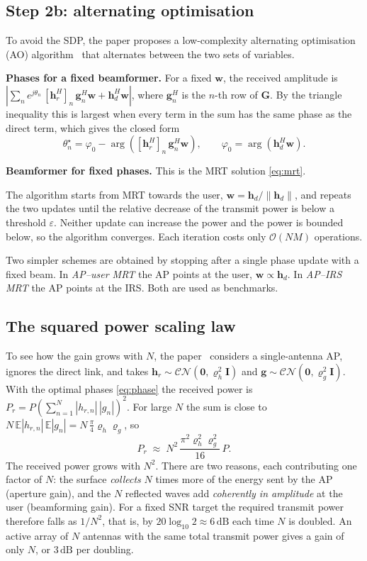 \documentclass[11pt,a4paper]{article}
\newcommand{\hrv}{\bm{h}_r}
\newcommand{\hdv}{\bm{h}_d}
\newcommand{\Gm}{\bm{G}}
\newcommand{\wv}{\bm{w}}
\newcommand{\udB}{\,\text{dB}}
\begin{document}
\subsection{Step 2b: alternating optimisation}

To avoid the SDP, the paper proposes a low-complexity alternating optimisation (AO) algorithm~\cite[Sec.~III-B]{wu} that alternates between the two sets of
variables.

\textbf{Phases for a fixed beamformer.} For a fixed $\wv$, the received amplitude is
$\left|\sum_{n} e^{j\theta_n}\,[\hrv^H]_n\,\bm{g}_n^H\wv + \hdv^H\wv\right|$, where $\bm{g}_n^H$ is the
$n$-th row of $\Gm$. By the triangle inequality this is largest when every term in the sum has the same
phase as the direct term, which gives the closed form
\begin{equation}
\theta_n^\star = \varphi_0 - \arg\!\left([\hrv^H]_n\,\bm{g}_n^H\wv\right),
\qquad \varphi_0=\arg\!\left(\hdv^H\wv\right).
\label{eq:phase}
\end{equation}

\textbf{Beamformer for fixed phases.} This is the MRT solution \eqref{eq:mrt}.

The algorithm starts from MRT towards the user, $\wv=\hdv/\|\hdv\|$, and repeats the two updates until
the relative decrease of the transmit power is below a threshold $\varepsilon$. Neither update can
increase the power and the power is bounded below, so the algorithm converges. Each iteration costs
only $\mathcal{O}(NM)$ operations.

Two simpler schemes are obtained by stopping after a single phase update with a fixed beam. In
\emph{AP--user MRT} the AP points at the user, $\wv\propto\hdv$. In \emph{AP--IRS MRT} the AP points at
the IRS. Both are used as benchmarks.

\subsection{The squared power scaling law}

To see how the gain grows with $N$, the paper~\cite[Prop.~2]{wu} considers a single-antenna AP, ignores the direct link,
and takes $\hrv\sim\mathcal{CN}(\bm{0},\varrho_h^2\bm{I})$ and $\bm{g}\sim\mathcal{CN}(\bm{0},\varrho_g^2\bm{I})$.
With the optimal phases \eqref{eq:phase} the received power is
$P_r = P\left(\sum_{n=1}^N |h_{r,n}|\,|g_n|\right)^2$. For large $N$ the sum is close to
$N\,\mathbb{E}|h_{r,n}|\,\mathbb{E}|g_n| = N\,\tfrac{\pi}{4}\varrho_h\varrho_g$, so
\begin{equation}
P_r \;\approx\; N^2\,\frac{\pi^2\varrho_h^2\varrho_g^2}{16}\,P .
\label{eq:n2}
\end{equation}
The received power grows with $N^2$. There are two reasons, each contributing one factor of $N$: the
surface \emph{collects} $N$ times more of the energy sent by the AP (aperture gain), and the $N$
reflected waves add \emph{coherently in amplitude} at the user (beamforming gain). For a fixed SNR
target the required transmit power therefore falls as $1/N^2$, that is, by $20\log_{10}2\approx6\udB$
each time $N$ is doubled. An active array of $N$ antennas with the same total transmit power gives a
gain of only $N$, or $3\udB$ per doubling.
\end{document}

